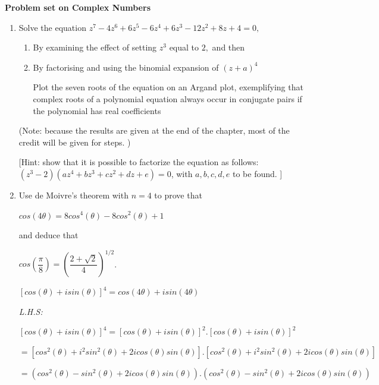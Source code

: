 \documentclass[fleqn]{article}
\begin{document}

\pagebreak


\textbf{Problem set on Complex Numbers}

\begin{enumerate}

  \item  Solve the equation  $z^7-4z^6+6z^5-6z^4+6z^3-12z^2+8z+4=0,$

    \begin{enumerate}
      \item By examining the effect of setting $z^3$ equal to $2,$ and then 
      \item By factorising and using the binomial expansion of $(z+a)^4$

      \bigbreak

      Plot the seven roots of the equation on an Argand plot, exemplifying that complex roots of a polynomial equation always occur in conjugate pairs if the polynomial has real coefficients
    \end{enumerate}

  
  (Note: because the results are given at the end of the chapter, most of the  credit will be given for steps. ) 
  
  [Hint:  show that it is possible to factorize the equation as follows: $(z^3-2)(a z^4 + b z^3 + c z^2 + d z + e)=0$, with $a,b,c,d,e$ to be found. ]
  
  \item  Use de Moivre’s theorem with $n=4$ to prove that

  $cos(4\theta)=8cos^4(\theta)-8cos^2(\theta)+1$

  and deduce that 

  $cos(\dfrac{\pi}{8})=(\dfrac{2+\sqrt{2}}{4})^{1/2}$.

  \bigbreak

  \bigbreak


    $[cos(\theta)+isin(\theta)]^4=cos(4\theta)+isin(4\theta)$

    \emph{L.H.S:}

    $[cos(\theta)+isin(\theta)]^4=[cos(\theta)+isin(\theta)]^2.[cos(\theta)+isin(\theta)]^2$

    $=[cos^2(\theta)+i^2sin^2(\theta)+2icos(\theta)sin(\theta)].[cos^2(\theta)+i^2sin^2(\theta)+2icos(\theta)sin(\theta)]$

    $=(cos^2(\theta)-sin^2(\theta)+2icos(\theta)sin(\theta)).(cos^2(\theta)-sin^2(\theta)+2icos(\theta)sin(\theta))$


\end{enumerate}
\end{document}
